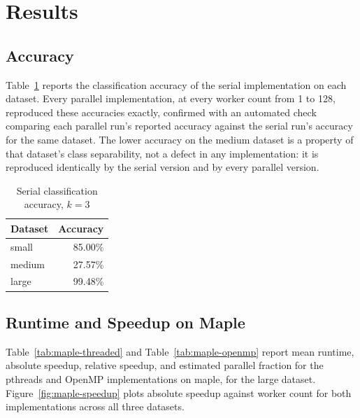 \documentclass[conference]{IEEEtran}
\begin{document}
\section{Results}
\label{sec:results}

\subsection{Accuracy}

Table~\ref{tab:accuracy} reports the classification accuracy of the serial
implementation on each dataset. Every parallel implementation, at every
worker count from 1 to 128, reproduced these accuracies exactly, confirmed
with an automated check comparing each parallel run's reported accuracy
against the serial run's accuracy for the same dataset. The lower accuracy
on the medium dataset is a property of that dataset's class separability,
not a defect in any implementation: it is reproduced identically by the
serial version and by every parallel version.

\begin{table}[htbp]
\caption{Serial classification accuracy, $k=3$}
\label{tab:accuracy}
\centering
\begin{tabular}{lr}
\toprule
Dataset & Accuracy \\
\midrule
small  & 85.00\% \\
medium & 27.57\% \\
large  & 99.48\% \\
\bottomrule
\end{tabular}
\end{table}

\subsection{Runtime and Speedup on Maple}

Table~\ref{tab:maple-threaded} and Table~\ref{tab:maple-openmp} report mean
runtime, absolute speedup, relative speedup, and estimated parallel
fraction for the pthreads and OpenMP implementations on maple, for the
large dataset. Figure~\ref{fig:maple-speedup} plots absolute speedup
against worker count for both implementations across all three datasets.
\end{document}

